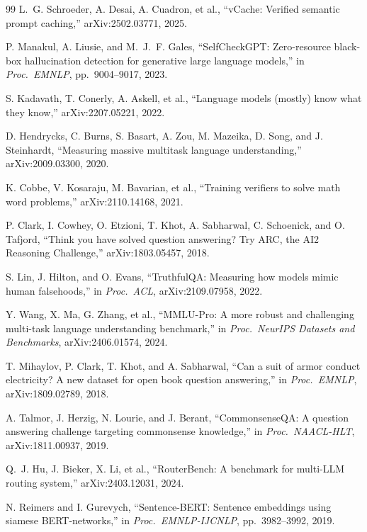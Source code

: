\documentclass[conference]{IEEEtran}
\begin{document}
\begin{thebibliography}{99}
L.~G. Schroeder, A. Desai, A. Cuadron, et al., ``vCache: Verified semantic prompt caching,'' arXiv:2502.03771, 2025.

P. Manakul, A. Liusie, and M.~J.~F. Gales, ``SelfCheckGPT: Zero-resource black-box hallucination detection for generative large language models,'' in \textit{Proc.\ EMNLP}, pp.\ 9004--9017, 2023.

S. Kadavath, T. Conerly, A. Askell, et al., ``Language models (mostly) know what they know,'' arXiv:2207.05221, 2022.

D. Hendrycks, C. Burns, S. Basart, A. Zou, M. Mazeika, D. Song, and J. Steinhardt, ``Measuring massive multitask language understanding,'' arXiv:2009.03300, 2020.

K. Cobbe, V. Kosaraju, M. Bavarian, et al., ``Training verifiers to solve math word problems,'' arXiv:2110.14168, 2021.

P. Clark, I. Cowhey, O. Etzioni, T. Khot, A. Sabharwal, C. Schoenick, and O. Tafjord, ``Think you have solved question answering? Try ARC, the AI2 Reasoning Challenge,'' arXiv:1803.05457, 2018.

S. Lin, J. Hilton, and O. Evans, ``TruthfulQA: Measuring how models mimic human falsehoods,'' in \textit{Proc.\ ACL}, arXiv:2109.07958, 2022.

Y. Wang, X. Ma, G. Zhang, et al., ``MMLU-Pro: A more robust and challenging multi-task language understanding benchmark,'' in \textit{Proc.\ NeurIPS Datasets and Benchmarks}, arXiv:2406.01574, 2024.

T. Mihaylov, P. Clark, T. Khot, and A. Sabharwal, ``Can a suit of armor conduct electricity? A new dataset for open book question answering,'' in \textit{Proc.\ EMNLP}, arXiv:1809.02789, 2018.

A. Talmor, J. Herzig, N. Lourie, and J. Berant, ``CommonsenseQA: A question answering challenge targeting commonsense knowledge,'' in \textit{Proc.\ NAACL-HLT}, arXiv:1811.00937, 2019.

Q.~J. Hu, J. Bieker, X. Li, et al., ``RouterBench: A benchmark for multi-LLM routing system,'' arXiv:2403.12031, 2024.

N. Reimers and I. Gurevych, ``Sentence-BERT: Sentence embeddings using siamese BERT-networks,'' in \textit{Proc.\ EMNLP-IJCNLP}, pp.\ 3982--3992, 2019.


\end{thebibliography}
\end{document}
